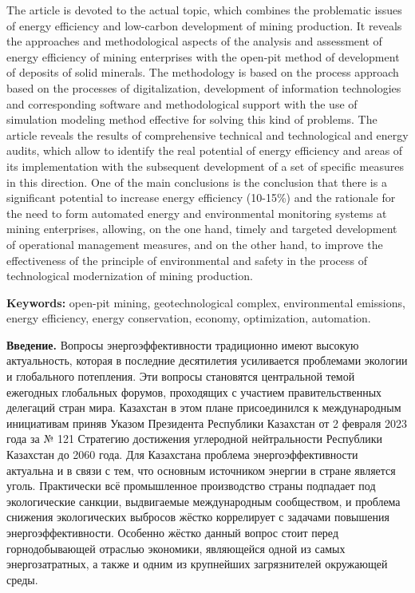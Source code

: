 The article is devoted to the actual topic, which combines the
problematic issues of energy efficiency and low-carbon development of
mining production. It reveals the approaches and methodological aspects
of the analysis and assessment of energy efficiency of mining
enterprises with the open-pit method of development of deposits of solid
minerals. The methodology is based on the process approach based on the
processes of digitalization, development of information technologies and
corresponding software and methodological support with the use of
simulation modeling method effective for solving this kind of problems.
The article reveals the results of comprehensive technical and
technological and energy audits, which allow to identify the real
potential of energy efficiency and areas of its implementation with the
subsequent development of a set of specific measures in this direction.
One of the main conclusions is the conclusion that there is a
significant potential to increase energy efficiency (10-15\%) and the
rationale for the need to form automated energy and environmental
monitoring systems at mining enterprises, allowing, on the one hand,
timely and targeted development of operational management measures, and
on the other hand, to improve the effectiveness of the principle of
environmental and safety in the process of technological modernization
of mining production.

{\bfseries Keywords:} open-pit mining, geotechnological complex,
environmental emissions, energy efficiency, energy conservation,
economy, optimization, automation.

{\bfseries Введение.} Вопросы энергоэффективности традиционно имеют высокую
актуальность, которая в последние десятилетия усиливается проблемами
экологии и глобального потепления. Эти вопросы становятся центральной
темой ежегодных глобальных форумов, проходящих с участием
правительственных делегаций стран мира. Казахстан в этом плане
присоединился к международным инициативам приняв Указом Президента
Республики Казахстан от 2 февраля 2023 года за № 121 Стратегию
достижения углеродной нейтральности Республики Казахстан до 2060 года.
Для Казахстана проблема энергоэффективности актуальна и в связи с тем,
что основным источником энергии в стране является уголь. Практически всё
промышленное производство страны подпадает под экологические санкции,
выдвигаемые международным сообществом, и проблема снижения экологических
выбросов жёстко коррелирует с задачами повышения энергоэффективности.
Особенно жёстко данный вопрос стоит перед горнодобывающей отраслью
экономики, являющейся одной из самых энергозатратных, а также и одним из
крупнейших загрязнителей окружающей среды.

